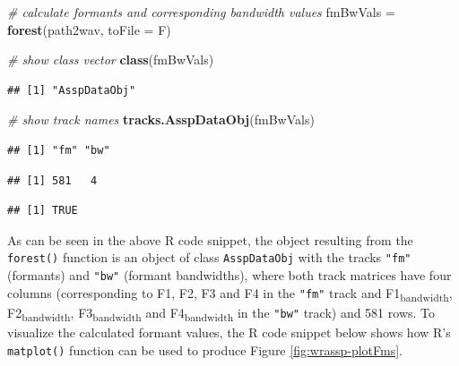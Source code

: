 \documentclass[]{book}
\newenvironment{Shaded}{\begin{snugshade}}{\end{snugshade}}
\newcommand{\CommentTok}[1]{\textcolor[rgb]{0.56,0.35,0.01}{\textit{#1}}}
\newcommand{\DataTypeTok}[1]{\textcolor[rgb]{0.13,0.29,0.53}{#1}}
\newcommand{\KeywordTok}[1]{\textcolor[rgb]{0.13,0.29,0.53}{\textbf{#1}}}
\newcommand{\NormalTok}[1]{#1}
\newcommand{\OperatorTok}[1]{\textcolor[rgb]{0.81,0.36,0.00}{\textbf{#1}}}
\newcommand{\StringTok}[1]{\textcolor[rgb]{0.31,0.60,0.02}{#1}}
\begin{document}
\begin{Shaded}
\begin{Highlighting}[]
\CommentTok{# calculate formants and corresponding bandwidth values}
\NormalTok{fmBwVals =}\StringTok{ }\KeywordTok{forest}\NormalTok{(path2wav, }\DataTypeTok{toFile =}\NormalTok{ F)}

\CommentTok{# show class vector}
\KeywordTok{class}\NormalTok{(fmBwVals)}
\end{Highlighting}
\end{Shaded}

\begin{verbatim}
## [1] "AsspDataObj"
\end{verbatim}

\begin{Shaded}
\begin{Highlighting}[]
\CommentTok{# show track names}
\KeywordTok{tracks.AsspDataObj}\NormalTok{(fmBwVals)}
\end{Highlighting}
\end{Shaded}

\begin{verbatim}
## [1] "fm" "bw"
\end{verbatim}

\begin{Shaded}
\end{Shaded}

\begin{verbatim}
## [1] 581   4
\end{verbatim}

\begin{Shaded}
\end{Shaded}

\begin{verbatim}
## [1] TRUE
\end{verbatim}

As can be seen in the above R code snippet, the object resulting from the \texttt{forest()} function is an object of class \texttt{AsspDataObj} with the tracks \texttt{"fm"} (formants) and \texttt{"bw"} (formant bandwidths), where both track matrices have four columns (corresponding to F1, F2, F3 and F4 in the \texttt{"fm"} track and F1\textsubscript{bandwidth}, F2\textsubscript{bandwidth}, F3\textsubscript{bandwidth} and F4\textsubscript{bandwidth} in the \texttt{"bw"} track) and 581 rows. To visualize the calculated formant values, the R code snippet below shows how R's \texttt{matplot()} function can be used to produce Figure \ref{fig:wrassp-plotFms}.
\end{document}
